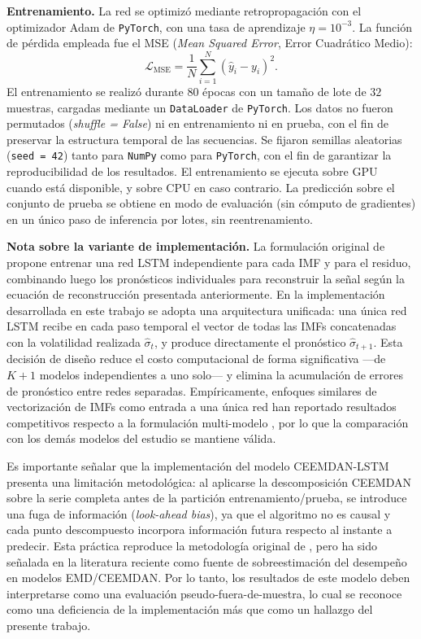 \documentclass[12pt]{paper}
\begin{document}
\textbf{Entrenamiento.} La red se optimizó mediante retropropagación con el optimizador Adam \citep{kingma2015adam} de \texttt{PyTorch}, con una tasa de aprendizaje $\eta = 10^{-3}$. La función de pérdida empleada fue el MSE (\textit{Mean Squared Error}, Error Cuadrático Medio):
\begin{equation}
    \mathcal{L}_{\mathrm{MSE}} = \frac{1}{N}\sum_{i=1}^{N}(\hat{y}_i - y_i)^2.
\end{equation}
El entrenamiento se realizó durante $80$ épocas con un tamaño de lote de $32$ muestras, cargadas mediante un \texttt{DataLoader} de \texttt{PyTorch}. Los datos no fueron permutados (\textit{shuffle = False}) ni en entrenamiento ni en prueba, con el fin de preservar la estructura temporal de las secuencias. Se fijaron semillas aleatorias (\texttt{seed = 42}) tanto para \texttt{NumPy} como para \texttt{PyTorch}, con el fin de garantizar la reproducibilidad de los resultados. El entrenamiento se ejecuta sobre GPU cuando está disponible, y sobre CPU en caso contrario. La predicción sobre el conjunto de prueba se obtiene en modo de evaluación (sin cómputo de gradientes) en un único paso de inferencia por lotes, sin reentrenamiento.

\textbf{Nota sobre la variante de implementación.} La formulación original de \citet{cao2019financial} propone entrenar una red LSTM independiente para cada IMF y para el residuo, combinando luego los pronósticos individuales para reconstruir la señal según la ecuación de reconstrucción presentada anteriormente. En la implementación desarrollada en este trabajo se adopta una arquitectura unificada: una única red LSTM recibe en cada paso temporal el vector de todas las IMFs concatenadas con la volatilidad realizada $\hat{\sigma}_t$, y produce directamente el pronóstico $\hat{\sigma}_{t+1}$. Esta decisión de diseño reduce el costo computacional de forma significativa —de $K+1$ modelos independientes a uno solo— y elimina la acumulación de errores de pronóstico entre redes separadas. Empíricamente, enfoques similares de vectorización de IMFs como entrada a una única red han reportado resultados competitivos respecto a la formulación multi-modelo \citep{lin2021ceemdanlstm}, por lo que la comparación con los demás modelos del estudio se mantiene válida.

Es importante señalar que la implementación del modelo CEEMDAN-LSTM presenta una limitación metodológica: al aplicarse la descomposición CEEMDAN sobre la serie completa antes de la partición entrenamiento/prueba, se introduce una fuga de información (\textit{look-ahead bias}), ya que el algoritmo no es causal y cada punto descompuesto incorpora información futura respecto al instante a predecir. Esta práctica reproduce la metodología original de \citet{cao2019financial}, pero ha sido señalada en la literatura reciente como fuente de sobreestimación del desempeño en modelos EMD/CEEMDAN. Por lo tanto, los resultados de este modelo deben interpretarse como una evaluación pseudo-fuera-de-muestra, lo cual se reconoce como una deficiencia de la implementación más que como un hallazgo del presente trabajo.
\end{document}
